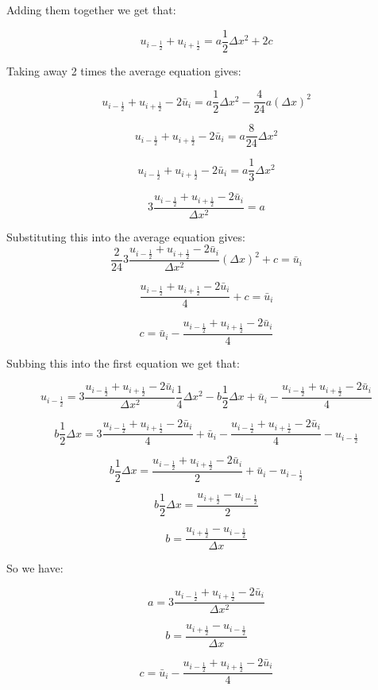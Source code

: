 \documentclass[12pt]{article}
\begin{document}
Adding them together we get that:

\[u_{i - \frac{1}{2}} + u_{i + \frac{1}{2}}  = a\frac{1}{2}\Delta x^2 + 2c  \]

Taking away 2 times the average equation gives:

\[u_{i - \frac{1}{2}} + u_{i + \frac{1}{2}} - 2\bar{u}_i   = a\frac{1}{2}\Delta x^2  - \frac{4}{24}a(\Delta x)^2   \]

\[u_{i - \frac{1}{2}} + u_{i + \frac{1}{2}} - 2\bar{u}_i   = a\frac{8}{24}\Delta x^2  \]

\[u_{i - \frac{1}{2}} + u_{i + \frac{1}{2}} - 2\bar{u}_i   = a\frac{1}{3}\Delta x^2  \]

\[3 \frac{u_{i - \frac{1}{2}} + u_{i + \frac{1}{2}} - 2\bar{u}_i}{\Delta x^2}   = a \]

Substituting this into the average equation gives:
\[\frac{2}{24} 3 \frac{u_{i - \frac{1}{2}} + u_{i + \frac{1}{2}} - 2\bar{u}_i}{\Delta x^2}  (\Delta x)^2 + c =\bar{u}_i \]

\[\frac{u_{i - \frac{1}{2}} + u_{i + \frac{1}{2}} - 2\bar{u}_i}{4} + c =\bar{u}_i \]

\[  c = \bar{u}_i - \frac{u_{i - \frac{1}{2}} + u_{i + \frac{1}{2}} - 2\bar{u}_i}{4}\]

Subbing this into the first equation we get that:

\[u_{i - \frac{1}{2}} = 3 \frac{u_{i - \frac{1}{2}} + u_{i + \frac{1}{2}} - 2\bar{u}_i}{\Delta x^2}\frac{1}{4}\Delta x^2 - b\frac{1}{2}\Delta x + \bar{u}_i - \frac{u_{i - \frac{1}{2}} + u_{i + \frac{1}{2}} - 2\bar{u}_i}{4}  \]

\[ b\frac{1}{2}\Delta x= 3 \frac{u_{i - \frac{1}{2}} + u_{i + \frac{1}{2}} - 2\bar{u}_i}{4} + \bar{u}_i - \frac{u_{i - \frac{1}{2}} + u_{i + \frac{1}{2}} - 2\bar{u}_i}{4} - u_{i - \frac{1}{2}}   \]

\[ b\frac{1}{2}\Delta x= \frac{u_{i - \frac{1}{2}} + u_{i + \frac{1}{2}} - 2\bar{u}_i}{2} + \bar{u}_i - u_{i - \frac{1}{2}}   \]

\[ b\frac{1}{2}\Delta x= \frac{u_{i + \frac{1}{2}} - u_{i - \frac{1}{2}}}{2}   \]

\[ b= \frac{u_{i + \frac{1}{2}} - u_{i - \frac{1}{2}}}{\Delta x}   \]

So we have:

\[a = 3 \frac{u_{i - \frac{1}{2}} + u_{i + \frac{1}{2}} - 2\bar{u}_i}{\Delta x^2} \]

\[ b= \frac{u_{i + \frac{1}{2}} - u_{i - \frac{1}{2}}}{\Delta x}   \]

\[  c = \bar{u}_i - \frac{u_{i - \frac{1}{2}} + u_{i + \frac{1}{2}} - 2\bar{u}_i}{4}\]
\end{document}

